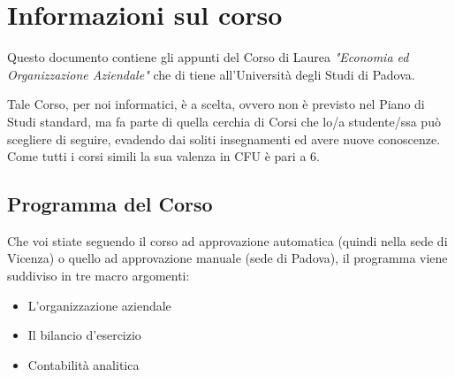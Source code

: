 \section{Informazioni sul corso}
Questo documento contiene gli appunti del Corso di Laurea \textit{"Economia ed Organizzazione Aziendale"} che di tiene all'Università degli Studi di Padova.

Tale Corso, per noi informatici, è a scelta, ovvero non è previsto nel Piano di Studi standard, ma fa parte di quella cerchia di Corsi che lo/a studente/ssa può scegliere di seguire, evadendo dai soliti insegnamenti ed avere nuove conoscenze. Come tutti i corsi simili la sua valenza in CFU è pari a 6.

\subsection{Programma del Corso}
Che voi stiate seguendo il corso ad approvazione automatica (quindi nella sede di Vicenza) o quello ad approvazione manuale (sede di Padova), il programma viene suddiviso in tre macro argomenti:
\begin{itemize}
	\item L'organizzazione aziendale
	\item Il bilancio d'esercizio
	\item Contabilità analitica
\end{itemize}